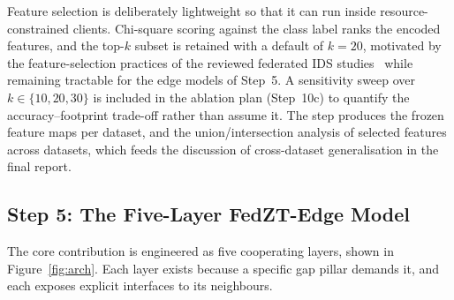 \documentclass[11pt,a4paper]{article}
\begin{document}
Feature selection is deliberately lightweight so that it can run inside
resource-constrained clients. Chi-square scoring against the class label
ranks the encoded features, and the top-$k$ subset is retained with a
default of $k = 20$, motivated by the feature-selection practices of the
reviewed federated IDS studies~\cite{albogami2025,karunamurthy2025} while
remaining tractable for the edge models of Step~5. A sensitivity sweep
over $k \in \{10, 20, 30\}$ is included in the ablation plan (Step~10c) to
quantify the accuracy--footprint trade-off rather than assume it. The step
produces the frozen feature maps per dataset, and the union/intersection
analysis of selected features across datasets, which feeds the discussion
of cross-dataset generalisation in the final report.

\subsection{Step 5: The Five-Layer FedZT-Edge Model}\label{sec:arch}

The core contribution is engineered as five cooperating layers, shown in
Figure~\ref{fig:arch}. Each layer exists because a specific gap pillar
demands it, and each exposes explicit interfaces to its neighbours.
\end{document}
